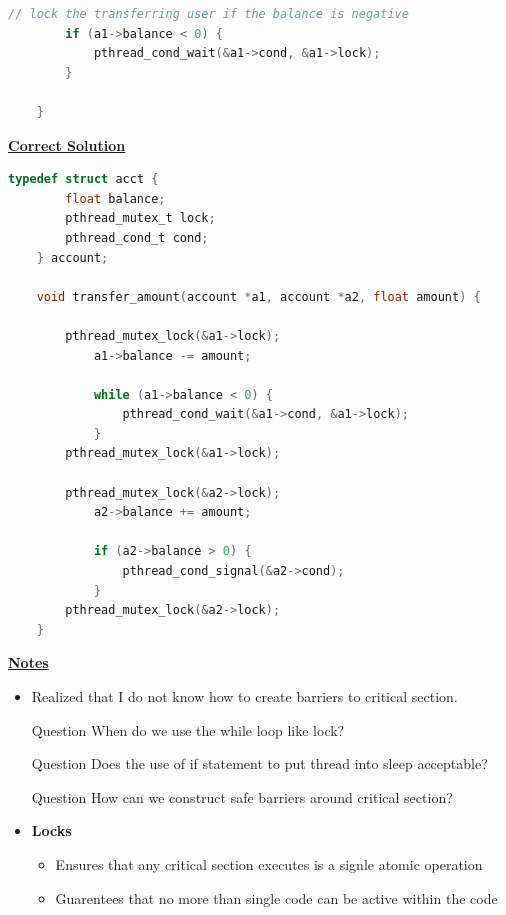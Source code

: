 \documentclass[12pt]{article}
\begin{document}
\begin{enumerate}[1.]
\begin{lstlisting}[language=c]
        // lock the transferring user if the balance is negative
        if (a1->balance < 0) {
            pthread_cond_wait(&a1->cond, &a1->lock);
        }

    }

\end{lstlisting}

    \bigskip

    \begin{mdframed}
    \underline{\textbf{Correct Solution}}

    \bigskip

\begin{lstlisting}[language=c]
    typedef struct acct {
        float balance;
        pthread_mutex_t lock;
        pthread_cond_t cond;
    } account;

    void transfer_amount(account *a1, account *a2, float amount) {

        pthread_mutex_lock(&a1->lock);
            a1->balance -= amount;

            while (a1->balance < 0) {
                pthread_cond_wait(&a1->cond, &a1->lock);
            }
        pthread_mutex_lock(&a1->lock);

        pthread_mutex_lock(&a2->lock);
            a2->balance += amount;

            if (a2->balance > 0) {
                pthread_cond_signal(&a2->cond);
            }
        pthread_mutex_lock(&a2->lock);
    }

\end{lstlisting}

    \end{mdframed}

    \bigskip

    \underline{\textbf{Notes}}

    \begin{itemize}
        \item Realized that I do not know how to create barriers to critical section.
        \item [\color{blue}Question\color{black}] When do we use the while loop like lock?
        \item [\color{blue}Question\color{black}] Does the use of if statement to put thread into sleep acceptable?
        \item [\color{blue}Question\color{black}] How can we construct safe barriers around critical section?
        \item \textbf{Locks}
        \begin{itemize}
            \item Ensures that any critical section executes is a signle atomic operation
            \item Guarentees that no more than single code can be active within the code
        \end{itemize}


\end{itemize}
\end{enumerate}
\end{document}
